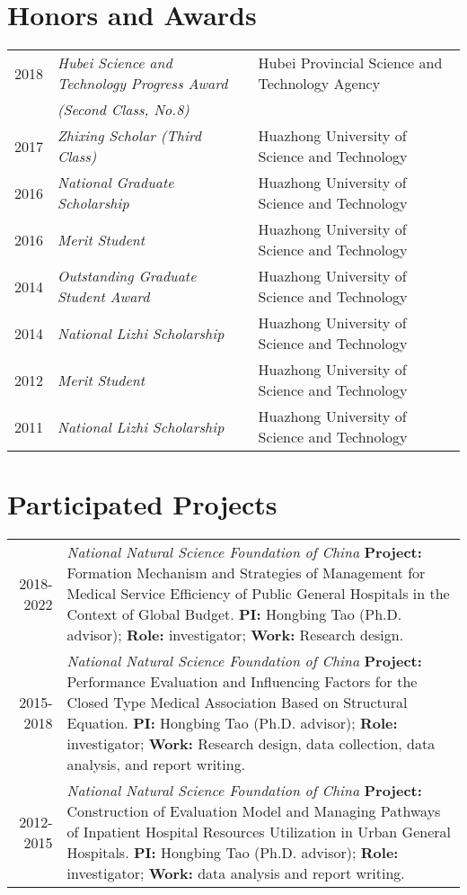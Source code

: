 \documentclass[a4paper,10pt]{article}
\begin{document}
\section{Honors and Awards}
\begin{tabular}{rll}
2018 &  \textit{Hubei Science and Technology Progress Award } & Hubei Provincial Science and Technology Agency\\
& \textit{(Second Class, No.8)} & \\
2017 & \textit{Zhixing Scholar (Third Class)} & Huazhong University of Science and Technology\\
2016 & \textit{National Graduate Scholarship} & Huazhong University of Science and Technology\\
2016 & \textit{Merit Student} &  Huazhong University of Science and Technology\\
2014 & 	\textit{Outstanding Graduate Student Award} & Huazhong University of Science and Technology\\
2014 & 	\textit{National Lizhi Scholarship} &  Huazhong University of Science and Technology\\
2012 & 	\textit{Merit Student} & Huazhong University of Science and Technology\\
2011 & 	\textit{National Lizhi Scholarship} & Huazhong University of Science and Technology
\end{tabular}

\section{Participated Projects}
\begin{tabular}{r p{12cm}}
2018-2022 & \emph{National Natural Science Foundation of China } \textbf{Project:} Formation Mechanism and Strategies of Management for Medical Service Efficiency of Public General Hospitals in the Context of Global Budget.  \textbf{PI:} Hongbing Tao (Ph.D. advisor); \textbf{Role: }investigator; \textbf{Work:} Research design.\\
2015-2018 & \emph{National Natural Science Foundation of China }  \textbf{Project:} Performance Evaluation and Influencing Factors for the Closed Type Medical Association Based on Structural Equation. \textbf{PI:} Hongbing Tao (Ph.D. advisor); \textbf{Role:} investigator; \textbf{Work:} Research design, data collection, data analysis, and report writing.\\
2012-2015 & \emph{National Natural Science Foundation of China } \textbf{Project:} Construction of Evaluation Model and Managing Pathways of Inpatient Hospital Resources Utilization in Urban General Hospitals. \textbf{PI:} Hongbing Tao (Ph.D. advisor); \textbf{Role:} investigator; \textbf{Work:} data analysis and report writing.
\end{tabular}
\end{document}
